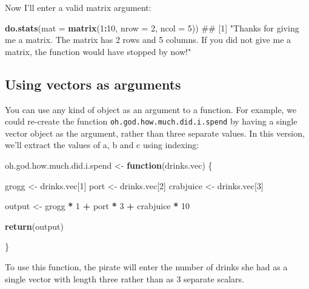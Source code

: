 \documentclass[]{book}
\newenvironment{Shaded}{\begin{snugshade}}{\end{snugshade}}
\newcommand{\KeywordTok}[1]{\textcolor[rgb]{0.13,0.29,0.53}{\textbf{#1}}}
\newcommand{\DataTypeTok}[1]{\textcolor[rgb]{0.13,0.29,0.53}{#1}}
\newcommand{\DecValTok}[1]{\textcolor[rgb]{0.00,0.00,0.81}{#1}}
\newcommand{\StringTok}[1]{\textcolor[rgb]{0.31,0.60,0.02}{#1}}
\newcommand{\ControlFlowTok}[1]{\textcolor[rgb]{0.13,0.29,0.53}{\textbf{#1}}}
\newcommand{\OperatorTok}[1]{\textcolor[rgb]{0.81,0.36,0.00}{\textbf{#1}}}
\newcommand{\NormalTok}[1]{#1}
\theoremstyle{definition}
\theoremstyle{definition}
\theoremstyle{remark}
\begin{document}
Now I'll enter a valid matrix argument:

\begin{Shaded}
\begin{Highlighting}[]
\KeywordTok{do.stats}\NormalTok{(}\DataTypeTok{mat =} \KeywordTok{matrix}\NormalTok{(}\DecValTok{1}\OperatorTok{:}\DecValTok{10}\NormalTok{, }\DataTypeTok{nrow =} \DecValTok{2}\NormalTok{, }\DataTypeTok{ncol =} \DecValTok{5}\NormalTok{))}
\NormalTok{## [1] "Thanks for giving me a matrix. The matrix has 2 rows and 5 columns. If you did not give me a matrix, the function would have stopped by now!"}
\end{Highlighting}
\end{Shaded}

\subsection{Using vectors as
arguments}\label{using-vectors-as-arguments}

You can use any kind of object as an argument to a function. For
example, we could re-create the function
\texttt{oh.god.how.much.did.i.spend} by having a single vector object as
the argument, rather than three separate values. In this version, we'll
extract the values of a, b and c using indexing:

\begin{Shaded}
\begin{Highlighting}[]
\NormalTok{oh.god.how.much.did.i.spend <-}\StringTok{ }\ControlFlowTok{function}\NormalTok{(drinks.vec) \{}

\NormalTok{  grogg <-}\StringTok{ }\NormalTok{drinks.vec[}\DecValTok{1}\NormalTok{]}
\NormalTok{  port <-}\StringTok{ }\NormalTok{drinks.vec[}\DecValTok{2}\NormalTok{]}
\NormalTok{  crabjuice <-}\StringTok{ }\NormalTok{drinks.vec[}\DecValTok{3}\NormalTok{]}

\NormalTok{  output <-}\StringTok{ }\NormalTok{grogg }\OperatorTok{*}\StringTok{ }\DecValTok{1} \OperatorTok{+}\StringTok{ }\NormalTok{port }\OperatorTok{*}\StringTok{ }\DecValTok{3} \OperatorTok{+}\StringTok{ }\NormalTok{crabjuice }\OperatorTok{*}\StringTok{ }\DecValTok{10}

  \KeywordTok{return}\NormalTok{(output)}

\NormalTok{\}}
\end{Highlighting}
\end{Shaded}

To use this function, the pirate will enter the number of drinks she had
as a single vector with length three rather than as 3 separate scalars.
\end{document}
